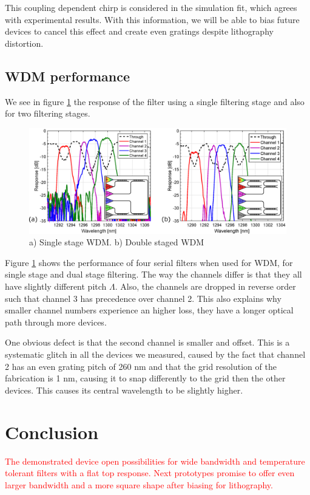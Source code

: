 \documentclass[letterpaper,10pt]{article}
\newcommand\todo[1]{\textcolor{red}{#1}}
\begin{document}
This coupling dependent chirp is considered in the simulation fit, which agrees with experimental results. With this information, we will be able to bias future devices to cancel this effect and create even gratings despite lithography distortion.

\subsection{WDM performance}
We see in figure \ref{fig:WDM} the response of the filter using a single filtering stage and also for two filtering stages.
\begin{figure}[htbp]
	\centering
	\includegraphics[width=.99\columnwidth]{WDM}
	\caption{a) Single stage WDM. b) Double staged WDM }
	\label{fig:WDM}
\end{figure}

Figure \ref{fig:WDM} shows the performance of four serial filters when used for WDM, for single stage and dual stage filtering. The way the channels differ is that they all have slightly different pitch $\Lambda$. Also, the channels are dropped in reverse order such that channel 3 has precedence over channel 2. This also explains why smaller channel numbers experience an higher loss, they have a longer optical path through more devices.

One obvious defect is that the second channel is smaller and offset. This is a systematic glitch in all the devices we measured, caused by the fact that channel 2 has an even grating pitch of 260 nm and that the grid resolution of the fabrication is 1 nm, causing it to snap differently to the grid then the other devices. This causes its central wavelength to be slightly higher.




\section{Conclusion}
\todo{The demonstrated device open possibilities for wide bandwidth and temperature tolerant filters with a flat top response. Next prototypes promise to offer even larger bandwidth and a more square shape after biasing for lithography.}
\end{document}
